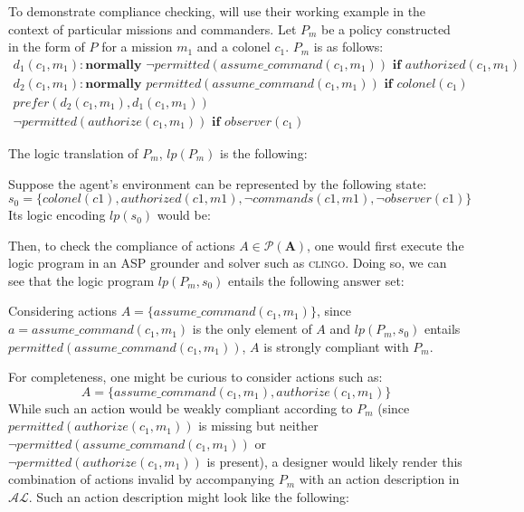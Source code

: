 To demonstrate compliance checking, \citet{gelfond_authorization_2008} will use their working example in the context of particular missions and commanders.
Let $P_m$ be a policy constructed in the form of $P$ for a mission $m_1$ and a colonel $c_1$.
$P_m$ is as follows:
\begin{gather}
    d_1(c_1, m_1): \textbf{normally } \neg permitted(assume\_command(c_1, m_1)) \textbf{ if } authorized(c_1, m_1) \\
    d_2(c_1, m_1): \textbf{normally } permitted(assume\_command(c_1, m_1)) \textbf{ if } colonel(c_1) \\
    prefer(d_2(c_1,m_1),d_1(c_1,m_1)) \\
    \neg permitted(authorize(c_1, m_1)) \textbf{ if } observer(c_1)
\end{gather}

The logic translation of $P_m$, $lp(P_m)$ is the following:


Suppose the agent's environment can be represented by the following state:
\begin{equation}
    s_0 = \{colonel(c1), authorized(c1,m1), \neg commands(c1,m1), \neg observer(c1) \}
\end{equation}
Its logic encoding $lp(s_0)$ would be:


Then, to check the compliance of actions $A \in \mathcal{P}(\boldsymbol{A})$, one would first execute the logic program in an ASP grounder and solver such as \textsc{clingo}.
Doing so, we can see that the logic program $lp(P_m, s_0)$ entails the following answer set:


Considering actions $A=\{assume\_command(c_1, m_1)\}$, since $a = assume\_command(c_1, m_1)$ is the only element of $A$ and $lp(P_m, s_0)$ entails $permitted(assume\_command(c_1, m_1))$, $A$ is strongly compliant with $P_m$.

For completeness, one might be curious to consider actions such as:
\begin{equation}
    A = \{assume\_command(c_1, m_1), authorize(c_1, m_1)\}
\end{equation}
While such an action would be weakly compliant according to $P_m$ (since $permitted(authorize(c_1, m_1))$ is missing but neither $\neg permitted(assume\_command(c_1, m_1))$ or $\neg permitted(authorize(c_1, m_1))$ is present), a designer would likely render this combination of actions invalid by accompanying $P_m$ with an action description in $\mathcal{AL}$.
Such an action description might look like the following:

